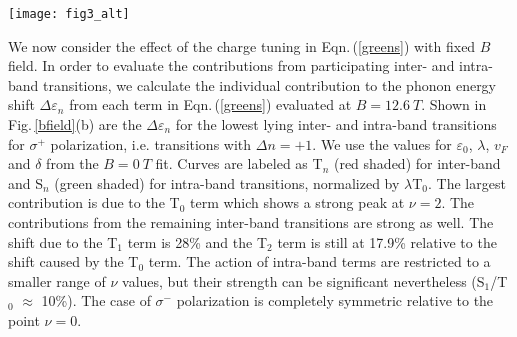 \documentclass[prl,aps,superscriptaddress,showpacs,reprint]{revtex4-1}
\begin{document}
\begin{figure*}
\texttt{[image: fig3\_alt]}
\caption{\label{bfield} a) Schematic view of the Landau level spectrum at $B=12.6\: T$, filling factor $\nu=2$ and the lowest Landau level transitions participating in magneto-phonon coupling. Filled electronic states are highlighted using orange color. Red and blue arrows show transitions allowed by the selection rule $\Delta\left|n\right|= \pm 1$. Dashed arrows mark Pauli blocked transitions. Circular arrows represent the angular momentum involved in the transitions b) Relative strength and filling factor dependence of individual terms of the phonon self energy for $\sigma^+$-transitions. Terms describing interband transitions are shaded red, intraband transitions are shaded green.  c) Phonon energy as a function of the filling factor at $B=12.6\: T$. Vertical orange lines mark specific filling factors at $\nu=-6,-2,0,2,6$ where the n=-1,0,1 levels are completely filled/depleted with charge carriers ($\nu=0$ corresponds to half filling of $n$=$0$ level). The calculated magneto-phonon energies according to Eqn.\,(\ref{greens}) are plotted as solid red($\Delta n = +1$) and solid blue($\Delta n = -1$) lines.}
\end{figure*}

We now consider the effect of the charge tuning in Eqn.\,(\ref{greens}) with fixed $B$ field. 
In order to evaluate the contributions from participating inter- and intra-band transitions, we calculate the individual contribution to the phonon energy shift $\Delta\varepsilon_n$ from each term in Eqn.\,(\ref{greens}) evaluated at $B=12.6\: T$. Shown in Fig.\,\ref{bfield}(b) are the $\Delta\varepsilon_n$ for the lowest lying inter- and intra-band transitions for $\sigma^+$ polarization, i.e. transitions with $\Delta n =+1$. We use the values for $\varepsilon_0$, $\lambda$, $v_F$ and $\delta$ from the $B=0\: T$ fit. Curves are labeled as T$_n$ (red shaded) for inter-band and S$_n$ (green shaded) for intra-band transitions, normalized by $\lambda$T$_0$. The largest contribution is due to the T$_0$ term which shows a strong peak at $\nu=2$. The contributions from the remaining inter-band transitions are strong as well. The shift due to the T$_1$ term is 28\% and the T$_2$ term is still at 17.9\% relative to the shift caused by the T$_0$ term.
The action of intra-band terms are restricted to a smaller range of $\nu$ values, but their strength can be significant nevertheless (S$_1$/T$_0$ $\approx$ 10\%). The case of $\sigma^-$ polarization is completely symmetric relative to the point $\nu = 0$.
\end{document}
